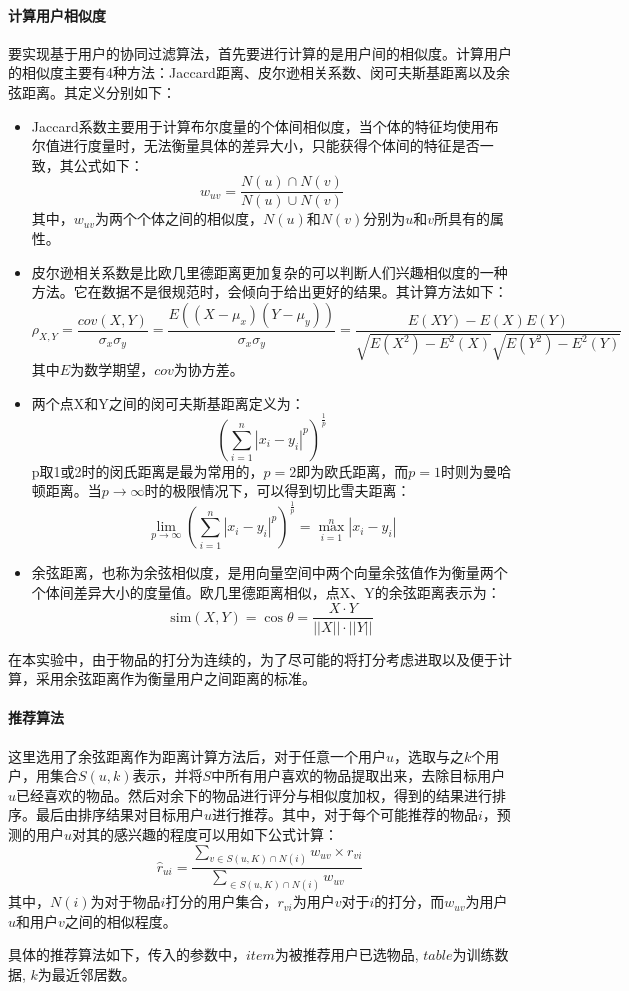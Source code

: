 \documentclass{article}
\begin{document}
\paragraph{计算用户相似度}
\label{par:ji_suan_yong_hu_xiang_si_du_}
\par 要实现基于用户的协同过滤算法，首先要进行计算的是用户间的相似度。计算用户的相似度主要有4种方法：Jaccard距离、皮尔逊相关系数、闵可夫斯基距离以及余弦距离。其定义分别如下：
\begin{itemize}
    \item Jaccard系数主要用于计算布尔度量的个体间相似度，当个体的特征均使用布尔值进行度量时，无法衡量具体的差异大小，只能获得个体间的特征是否一致，其公式如下：
        \[w_{uv} = \frac{N(u)\cap N(v)}{N(u)\cup N(v)}\]
        其中，\(w_{uv}\)为两个个体之间的相似度，\(N(u)\)和\(N(v)\)分别为\(u\)和\(v\)所具有的属性。
    \item 皮尔逊相关系数是比欧几里德距离更加复杂的可以判断人们兴趣相似度的一种方法。它在数据不是很规范时，会倾向于给出更好的结果。其计算方法如下：
        \[
            \rho_{X,Y} = \frac{cov(X, Y)}{\sigma_x\sigma_y}
            = \frac{E((X - \mu_x)(Y - \mu_y))}{\sigma_x\sigma_y}
            = \frac{E(XY) - E(X)E(Y)}{\sqrt{E(X^2) - E^2(X)}\sqrt{E(Y^2) - E^2(Y)}}
        \]
        其中\(E\)为数学期望，\(cov\)为协方差。
    \item 两个点X和Y之间的闵可夫斯基距离定义为：
        \[\left(\sum_{i=1}^n|x_i - y_i|^p\right)^{\frac{1}{p}}\]
        p取1或2时的闵氏距离是最为常用的，\(p=2\)即为欧氏距离，而\(p=1\)时则为曼哈顿距离。当\(p\rightarrow \infty\)时的极限情况下，可以得到切比雪夫距离：
        \[\lim_{p\rightarrow \infty}\left(\sum_{i=1}^n|x_i - y_i|^p\right)^{\frac{1}{p}} = \max_{i=1}^n |x_i-y_i|\]
    \item 余弦距离，也称为余弦相似度，是用向量空间中两个向量余弦值作为衡量两个个体间差异大小的度量值。欧几里德距离相似，点X、Y的余弦距离表示为：
        \[\text{sim}(X, Y) = \cos{\theta} = \frac{X\cdot Y}{||X||\cdot||Y||}\]
\end{itemize}
\par 在本实验中，由于物品的打分为连续的，为了尽可能的将打分考虑进取以及便于计算，采用余弦距离作为衡量用户之间距离的标准。

\paragraph{推荐算法}
\label{par:tui_jian_suan_fa_}
\par 这里选用了余弦距离作为距离计算方法后，对于任意一个用户\(u\)，选取与之\(k\)个用户，用集合\(S(u,k)\)表示，并将\(S\)中所有用户喜欢的物品提取出来，去除目标用户\(u\)已经喜欢的物品。然后对余下的物品进行评分与相似度加权，得到的结果进行排序。最后由排序结果对目标用户\(u\)进行推荐。其中，对于每个可能推荐的物品\(i\)，预测的用户\(u\)对其的感兴趣的程度可以用如下公式计算：
\[\hat{r}_{ui} = \frac{\sum_{v\in S(u,K)\cap N(i)} w_{uv}\times r_{vi}}{\sum_{\in S(u,K)\cap N(i)} w_{uv}}\]
其中，\(N(i)\)为对于物品\(i\)打分的用户集合，\(r_{vi}\)为用户\(v\)对于\(i\)的打分，而\(w_{uv}\)为用户\(u\)和用户\(v\)之间的相似程度。
\par 具体的推荐算法如下，传入的参数中，\(item\)为被推荐用户已选物品, \(table\)为训练数据, \(k\)为最近邻居数。
\end{document}
